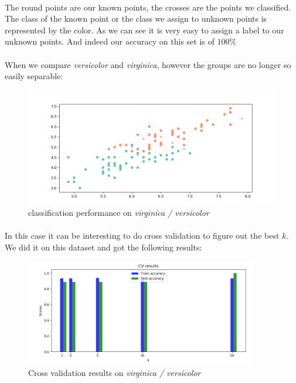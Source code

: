 \documentclass[11 pt]{article}
\begin{document}
\paragraph{}The round points are our known points, the crosses are the points we classified. The class of the known point or the class we assign to unknown points is represented by the color. As we can see it is very easy to assign a label to our unknown points. And indeed our accuracy on this set is of $100\%$
\paragraph{}When we compare \emph{versicolor} and \emph{virginica}, however the groups are no longer so easily separable:
\begin{center}
  \begin{figure}[H]
    \includegraphics[width=\textwidth]{figures/irisClass2_1.png}
    \caption{classification performance on \emph{virginica / versicolor}}
    \label{class12}
  \end{figure}
\end{center}
\paragraph{}In this case it can be interesting to do cross validation to figure out the best $k$. We did it on this dataset and got the following results:
\begin{center}
  \begin{figure}[H]
    \includegraphics[width=0.9\textwidth]{figures/iris2_1_cv.png}
    \caption{Cross validation results on \emph{virginica / versicolor}}
    \label{cv}
  \end{figure}
\end{center}
\end{document}
